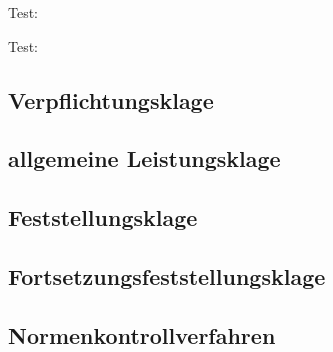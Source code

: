 \documentclass{article}
\begin{document}
Test: 

Test: 
\subsection{Verpflichtungsklage}
\subsection{allgemeine Leistungsklage}
\subsection{Feststellungsklage}
\subsection{Fortsetzungsfeststellungsklage}
\subsection{Normenkontrollverfahren}
\end{document}
